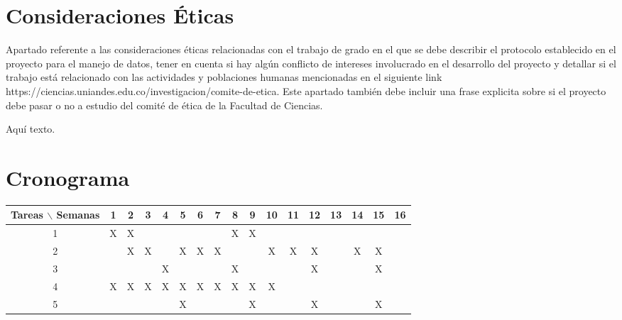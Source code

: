 \documentclass[12pt]{article}
\begin{document}


\section{Consideraciones Éticas}

Apartado referente a las consideraciones éticas relacionadas con el trabajo de grado en el que se debe describir el protocolo establecido en el proyecto para el manejo de datos, tener en cuenta si hay algún conflicto de intereses involucrado en el desarrollo del proyecto y detallar si el trabajo está relacionado con las actividades y poblaciones humanas mencionadas en el siguiente link https://ciencias.uniandes.edu.co/investigacion/comite-de-etica. Este apartado también debe incluir una frase explicita sobre si el proyecto debe pasar o no a estudio del comité de ética de la Facultad de Ciencias.

Aqu\'i texto.

\section{Cronograma}

\begin{table}[htb]
	\begin{tabular}{|c|cccccccccccccccc| }
	\hline
	Tareas $\backslash$ Semanas & 1 & 2 & 3 & 4 & 5 & 6 & 7 & 8 & 9 & 10 & 11 & 12 & 13 & 14 & 15 & 16  \\
	\hline
	1 & X & X &   &   &   &   &   & X & X &   &   &   &   &   &   &   \\
	2 &   & X & X &   & X & X & X &   &   & X & X & X &   & X & X &   \\
	3 &   &   &   & X &   &   &   & X &   &   &   & X &   &   & X &   \\
	4 & X & X & X & X & X & X & X & X & X & X &   &   &   &   &   &   \\
	5 &   &   &   &   & X &   &   &   & X &   &   & X &   &   & X &   \\
	\hline
	\end{tabular}
\end{table}
\vspace{1mm}
\end{document}
